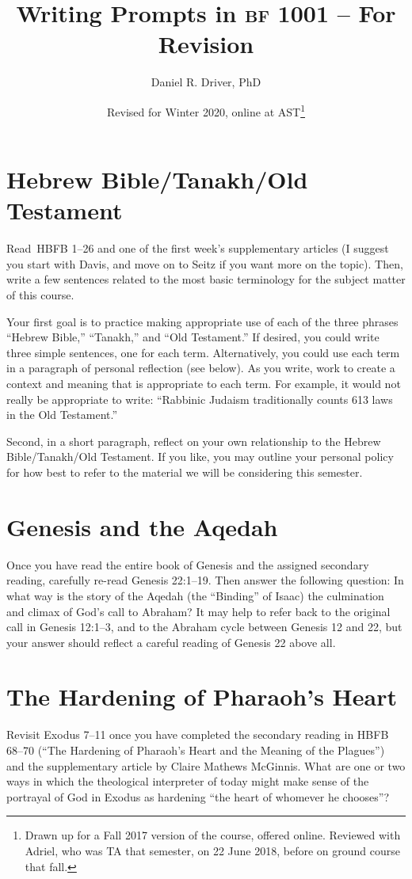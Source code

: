 \documentclass[12pt]{article}
\title{Writing Prompts in \textsc{bf} 1001 – For Revision}
\author{Daniel R. Driver, PhD}
\date{Revised for Winter 2020, online at AST\thanks{Drawn up for a Fall 2017 version of the course, offered online. Reviewed with Adriel, who was TA that semester, on 22 June 2018, before on ground course that fall.}}
\begin{document}
\maketitle

\section{Hebrew Bible/Tanakh/Old Testament}

Read HBFB 1–26 and one of the first week’s supplementary articles (I suggest you start with Davis, and move on to Seitz if you want more on the topic). Then, write a few sentences related to the most basic terminology for the subject matter of this course.

Your first goal is to practice making appropriate use of each of the three phrases “Hebrew Bible,” “Tanakh,” and “Old Testament.” If desired, you could write three simple sentences, one for each term. Alternatively, you could use each term in a paragraph of personal reflection (see below). As you write, work to create a context and meaning that is appropriate to each term. For example, it would not really be appropriate to write: “Rabbinic Judaism traditionally counts 613 laws in the Old Testament.”

Second, in a short paragraph, reflect on your own relationship to the Hebrew Bible/Tanakh/Old Testament. If you like, you may outline your personal policy for how best to refer to the material we will be considering this semester.

\section{Genesis and the Aqedah}

Once you have read the entire book of Genesis and the assigned secondary reading, carefully re-read Genesis 22:1–19. Then answer the following question: In what way is the story of the Aqedah (the “Binding” of Isaac) the culmination and climax of God’s call to Abraham? It may help to refer back to the original call in Genesis 12:1–3, and to the Abraham cycle between Genesis 12 and 22, but your answer should reflect a careful reading of Genesis 22 above all.


\section{The Hardening of Pharaoh's Heart}

Revisit Exodus 7–11 once you have completed the secondary reading in HBFB 68–70 (“The Hardening of Pharaoh’s Heart and the Meaning of the Plagues”) and the supplementary article by Claire Mathews McGinnis. What are one or two ways in which the theological interpreter of today might make sense of the portrayal of God in Exodus as hardening “the heart of whomever he chooses”?
\end{document}
